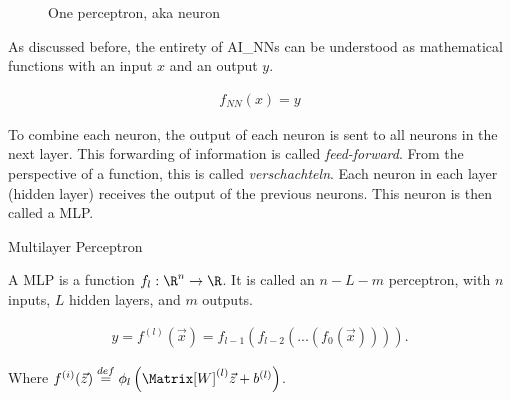 \begin{figure}[h]
\centering
{}
\caption{One perceptron, aka neuron}
\end{figure}

\pagebreak




As discussed before, the entirety of \glspl{AI_NN} can be understood as mathematical functions with an input $x$ and an output $y$.

\begin{align}
	f_{NN}(x) = y
\end{align} 

To combine each neuron, the output of each neuron is sent to all neurons in the next layer. This forwarding of information is called \textit{feed-forward}. From the perspective of a function, this is called \textit{verschachteln}. Each neuron in each layer (hidden layer) receives the output of the previous neurons. This neuron is then called a \gls{MLP}.

\begin{Definition}{Multilayer Perceptron}
	
	A \gls{MLP} is a function $f_l:\R^n \rightarrow \R$. It is called an $n-L-m$ perceptron, with $n$ inputs, $L$ hidden layers, and $m$ outputs.
	
	\begin{align}
		y = f^{(l)}(\vec{x}) = f_{l-1}\left(f_{l-2}\left(...\left(f_{0}(\vec{x})\right)\right)\right).
	\end{align}
	
	Where $f^{(i)}(\vec{z}) \stackrel{def}{=} \phi_l\left( \Matrix[W]^{(l)}\vec{z} + b^{(l)}\right)$.
\end{Definition}


